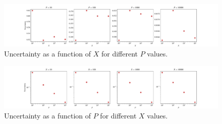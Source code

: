 %
\begin{figure}[htbp]
	\centering
	\includegraphics[width=\linewidth]{figs/1.5_uncertainty_function_of_x.pdf}
	\caption{Uncertainty as a function of $X$ for different $P$ values.}
	\label{fig:uncertainty_function_of_x}
\end{figure}
%
\begin{figure}[htbp]
	\centering
	\includegraphics[width=\linewidth]{figs/1.5_uncertainty_function_of_p.pdf}
	\caption{Uncertainty as a function of $P$ for different $X$ values.}
	\label{fig:uncertainty_function_of_p}
\end{figure}